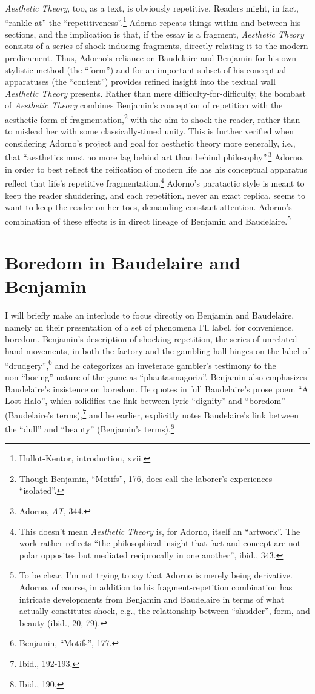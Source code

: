 \documentclass[12pt]{article}
\begin{document}
\textit{Aesthetic Theory}, too, as a text, is obviously repetitive. Readers might, in fact, ``rankle at'' the ``repetitiveness''.\footnote{Hullot-Kentor, introduction, xvii.} Adorno repeats things within and between his sections, and the implication is that, if the essay is a fragment, \textit{Aesthetic Theory} consists of a series of shock-inducing fragments, directly relating it to the modern predicament. Thus, Adorno's reliance on Baudelaire and Benjamin for his own stylistic method (the ``form'') and for an important subset of his conceptual apparatuses (the ``content'') provides refined insight into the textual wall \textit{Aesthetic Theory} presents. Rather than mere difficulty-for-difficulty, the bombast of \textit{Aesthetic Theory} combines Benjamin's conception of repetition with the aesthetic form of fragmentation,\footnote{Though Benjamin, ``Motifs'', 176, does call the laborer's experiences ``isolated''.} with the aim to shock the reader, rather than to mislead her with some classically-timed unity. This is further verified when considering Adorno's project and goal for aesthetic theory more generally, i.e., that ``aesthetics must no more lag behind art than behind philosophy''.\footnote{Adorno, \textit{AT}, 344.} Adorno, in order to best reflect the reification of modern life has his conceptual apparatus reflect that life's repetitive fragmentation.\footnote{This doesn't mean \textit{Aesthetic Theory} is, for Adorno, itself an ``artwork''. The work rather reflects ``the philosophical insight that fact and concept are not polar opposites but mediated reciprocally in one another'', ibid., 343.} Adorno's paratactic style is meant to keep the reader shuddering, and each repetition, never an exact replica, seems to want to keep the reader on her toes, demanding constant attention. Adorno's combination of these effects is in direct lineage of Benjamin and Baudelaire.\footnote{To be clear, I'm not trying to say that Adorno is merely being derivative. Adorno, of course, in addition to his fragment-repetition combination has intricate developments from Benjamin and Baudelaire in terms of what actually constitutes shock, e.g., the relationship between ``shudder'', form, and beauty (ibid., 20, 79).}

\section{Boredom in Baudelaire and Benjamin}
I will briefly make an interlude to focus directly on Benjamin and Baudelaire, namely on their presentation of a set of phenomena I'll label, for convenience, boredom. Benjamin's description of shocking repetition, the series of unrelated hand movements, in both the factory and the gambling hall hinges on the label of ``drudgery'',\footnote{Benjamin, ``Motifs'', 177.} and he categorizes an inveterate gambler's testimony to the non-``boring'' nature of the game as ``phantasmagoria''. Benjamin also emphasizes Baudelaire's insistence on boredom. He quotes in full Baudelaire's prose poem ``A Lost Halo'', which solidifies the link between lyric ``dignity'' and ``boredom'' (Baudelaire's terms),\footnote{Ibid., 192-193.} and he earlier, explicitly notes Baudelaire's link between the ``dull'' and ``beauty'' (Benjamin's terms).\footnote{Ibid., 190.}
\end{document}
